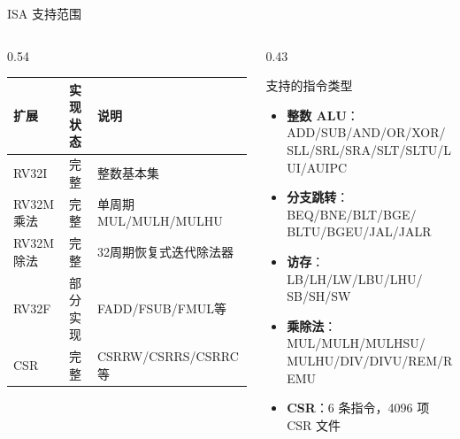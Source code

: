 \documentclass[aspectratio=169,xcolor={dvipsnames,svgnames},10pt]{beamer}
\begin{document}
\begin{frame}[shrink=15]{ISA 支持范围}
  \begin{columns}[T]
    \begin{column}{0.54\textwidth}
      \begin{center}
        \small
        \renewcommand{\arraystretch}{1.25}
        \begin{tabular}{lll}
          \toprule
          \textbf{扩展} & \textbf{实现状态} & \textbf{说明} \\
          \midrule
          RV32I          & 完整 & 整数基本集 \\
          RV32M 乘法     & 完整 & 单周期 MUL/MULH/MULHU \\
          RV32M 除法     & 完整 & 32周期恢复式迭代除法器 \\
          RV32F          & 部分实现 & FADD/FSUB/FMUL等 \\
          CSR            & 完整 & CSRRW/CSRRS/CSRRC 等 \\
          \bottomrule
        \end{tabular}
      \end{center}
    \end{column}
    \begin{column}{0.43\textwidth}
      \begin{block}{支持的指令类型}
        \small
        \begin{itemize}
          \item \textbf{整数 ALU}：ADD/SUB/AND/OR/XOR/\\
                SLL/SRL/SRA/SLT/SLTU/LUI/AUIPC
          \item \textbf{分支跳转}：BEQ/BNE/BLT/BGE/\\
                BLTU/BGEU/JAL/JALR
          \item \textbf{访存}：LB/LH/LW/LBU/LHU/\\
                SB/SH/SW
          \item \textbf{乘除法}：MUL/MULH/MULHSU/\\
                MULHU/DIV/DIVU/REM/REMU
          \item \textbf{CSR}：6 条指令，4096 项 CSR 文件
        \end{itemize}
      \end{block}
    \end{column}
  \end{columns}
\end{frame}
\end{document}
